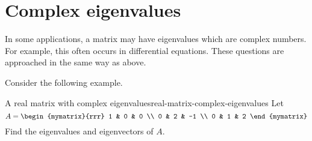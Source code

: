 \section{Complex eigenvalues}

In some applications, a matrix may have eigenvalues
 which are complex numbers. For example, this often occurs in
differential equations. These questions are approached in the same way as above.

Consider the following example.

\begin{example}{A real matrix with complex eigenvalues}{real-matrix-complex-eigenvalues}
Let 
\begin{equation*}
A=\begin{mymatrix}{rrr}
1 & 0 &  0 \\
0 & 2 & -1 \\
0 & 1 &  2
\end{mymatrix} 
\end{equation*}
Find the eigenvalues and eigenvectors of $A$.
\end{example}

